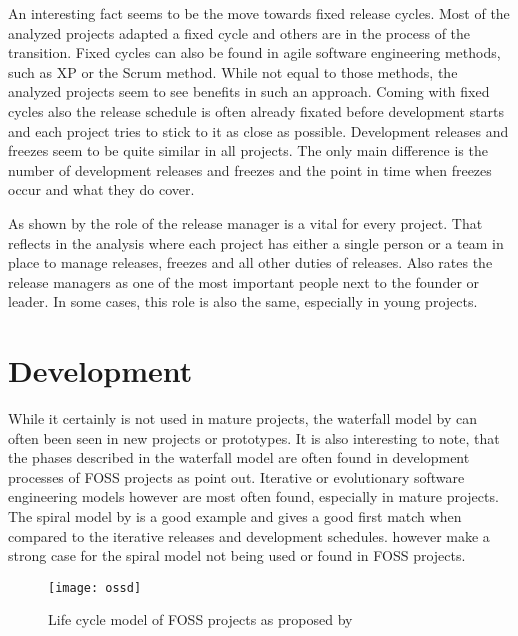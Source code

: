 An interesting fact seems to be the move towards fixed release cycles. Most of
the analyzed projects adapted a fixed cycle and others are in the process of
the transition. Fixed cycles can also be found in agile software engineering
methods, such as \acl{XP} or the Scrum method. While not equal to those
methods, the analyzed projects seem to see benefits in such an approach. Coming
with fixed cycles also the release schedule is often already fixated before
development starts and each project tries to stick to it as close as possible.
Development releases and freezes seem to be quite similar in all projects. The
only main difference is the number of development releases and freezes and the
point in time when freezes occur and what they do cover.

As shown by \textcite{Mockus2002} the role of the release manager is a vital
for every project. That reflects in the analysis where each project has either
a single person or a team in place to manage releases, freezes and all other
duties of releases. Also \textcite{Crowston2005} rates the release managers as
one of the most important people next to the founder or leader. In some cases,
this role is also the same, especially in young projects.


\section{Development} %

While it certainly is not used in mature projects, the waterfall model by
\textcite{Royce1970} can often been seen in new projects or prototypes. It is
also interesting to note, that the phases described in the waterfall model are
often found in development processes of \ac{FOSS} projects as
\textcite{Roets2007} point out. Iterative or evolutionary software engineering
models however are most often found, especially in mature projects. The spiral
model by \textcite{Boehm1988} is a good example and gives a good first match
when compared to the iterative releases and development schedules.
\textcite{Roets2007} however make a strong case for the spiral model not being
used or found in \ac{FOSS} projects.

\begin{figure}[htbp]
  \centering
  \texttt{[image: ossd]}
  \caption{Life cycle model of \acl{FOSS} projects as proposed by \textcite{Roets2007}}
\end{figure}

